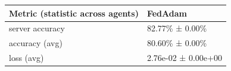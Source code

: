 \begin{tabular}{ll}
\hline
 Metric (statistic across agents)   & FedAdam             \\
\hline
 server accuracy                    & 82.77\% ± 0.00\%      \\
 accuracy (avg)                     & 80.60\% ± 0.00\%      \\
 loss (avg)                         & 2.76e-02 ± 0.00e+00 \\
\hline
\end{tabular}